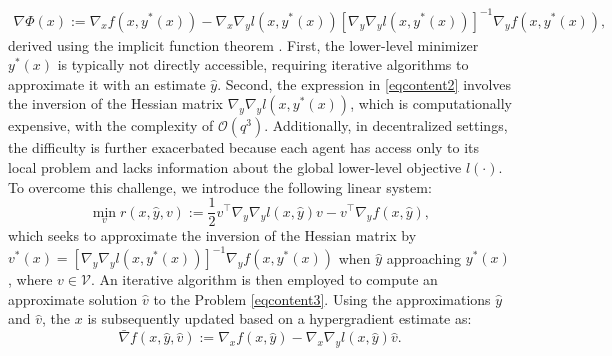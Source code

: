 \documentclass{article}
\theoremstyle{plain}
\theoremstyle{definition}
\theoremstyle{remark}
\def\ca#1{\mathcal{#1}}
\begin{document}
{\setlength{\abovedisplayskip}{3pt}
\setlength{\belowdisplayskip}{5pt}
\begin{equation} \label{eqcontent2}
    \begin{aligned}
    \nabla \Phi(x) :=\nabla_x f(x, y^*(x)) - \nabla_{x}\nabla_{y} l(x, y^*(x)) [\nabla_{y}\nabla_{y} l(x, y^*(x))]^{-1} \nabla_y f(x, y^*(x)),
\end{aligned}
\end{equation}}derived using the implicit function theorem \citep{ghadimi2018approximation}. First, the lower-level minimizer $y^*(x)$ is typically not directly accessible, requiring iterative algorithms to approximate it with an estimate $\hat{y}$. Second, the expression in \cref{eqcontent2} involves the inversion of the Hessian matrix $\nabla_{y}\nabla_{y} l(x, y^*(x))$, which is computationally expensive, with the complexity of $\ca{O}(q^3)$. Additionally, in decentralized settings, the difficulty is further exacerbated because each agent has access only to its local problem and lacks information about the global lower-level objective $l(\cdot)$.  
To overcome this challenge, we introduce the following linear system:
{\setlength{\abovedisplayskip}{3pt}
\setlength{\belowdisplayskip}{3pt}
\begin{equation}\label{eqcontent3}
\min_{v} r(x, \hat{y}, v) := \frac{1}{2} v^\top \nabla_y\nabla_y l(x, \hat{y}) v \!-\! v^\top \nabla_y f(x, \hat{y}),
\end{equation}}which seeks to approximate the inversion of the Hessian matrix by $ v^*(x)= [\nabla_{y}\nabla_{y} l(x, y^*(x))]^{-1} \nabla_y f(x, y^*(x))$ when $\hat{y}$ approaching $y^*(x)$, where $v\in\mathcal{V}$. 
An iterative algorithm is then employed to compute an approximate solution $\hat{v}$ to the Problem \eqref{eqcontent3}. Using the approximations $\hat{y}$ and $\hat{v}$, the $x$ is subsequently updated based on a hypergradient estimate as:
{\setlength{\abovedisplayskip}{7pt}
\setlength{\belowdisplayskip}{2.5pt}
\begin{equation} \label{eqcontent_grad_approx}
\bar{\nabla} f(x, \hat{y}, \hat{v}) := \nabla_x f(x, \hat{y}) - \nabla_x \nabla_y l(x, \hat{y}) \hat{v}.
\end{equation}}
\end{document}
